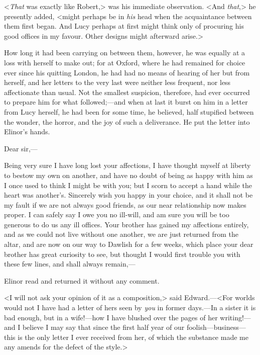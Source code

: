 <\textit{That} was exactly like Robert,> was his immediate observation. <And \textit{that},> he presently added, <might perhaps be in \textit{his} head when the acquaintance between them first began. And Lucy perhaps at first might think only of procuring his good offices in my favour. Other designs might afterward arise.>

How long it had been carrying on between them, however, he was equally at a loss with herself to make out; for at Oxford, where he had remained for choice ever since his quitting London, he had had no means of hearing of her but from herself, and her letters to the very last were neither less frequent, nor less affectionate than usual. Not the smallest suspicion, therefore, had ever occurred to prepare him for what followed;—and when at last it burst on him in a letter from Lucy herself, he had been for some time, he believed, half stupified between the wonder, the horror, and the joy of such a deliverance. He put the letter into Elinor's hands.


\begin{mail}{}{Dear sir,—}
	
Being very sure I have long lost your affections, I have thought myself at liberty to bestow my own on another, and have no doubt of being as happy with him as I once used to think I might be with you; but I scorn to accept a hand while the heart was another's. Sincerely wish you happy in your choice, and it shall not be my fault if we are not always good friends, as our near relationship now makes proper. I can safely say I owe you no ill-will, and am sure you will be too generous to do us any ill offices. Your brother has gained my affections entirely, and as we could not live without one another, we are just returned from the altar, and are now on our way to Dawlish for a few weeks, which place your dear brother has great curiosity to see, but thought I would first trouble you with these few lines, and shall always remain,—

\end{mail}





Elinor read and returned it without any comment.

<I will not ask your opinion of it as a composition,> said Edward.—<For worlds would not I have had a letter of hers seen by \textit{you} in former days.—In a sister it is bad enough, but in a wife!—how I have blushed over the pages of her writing!—and I believe I may say that since the first half year of our foolish—business—this is the only letter I ever received from her, of which the substance made me any amends for the defect of the style.>

